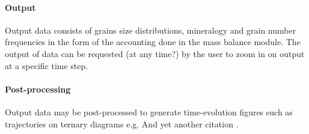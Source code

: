 \paragraph{Output}
Output data consists of grains size distributions, mineralogy and grain number frequencies in the form of the accounting done in the mass balance module. %
The output of data can be requested (at any time?) by the user to zoom in on output at a specific time step. %

\paragraph{Post-processing}
Output data may be post-processed to generate time-evolution figures such as trajectories on ternary diagrams e.g. %
And yet another citation \cite{FrRo2010Diffusion}. %








\cleardoublepage

